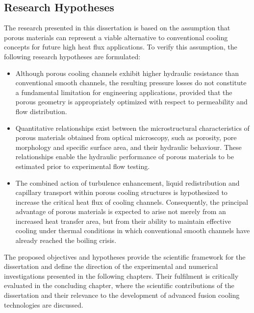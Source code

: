 \documentclass[a4paper]{article}
\begin{document}
\subsection{Research Hypotheses}

The research presented in this dissertation is based on the assumption that porous materials can represent a viable alternative to conventional cooling concepts for future high heat flux applications. To verify this assumption, the following research hypotheses are formulated:

\begin{itemize}

\item[\textbf{H1}] Although porous cooling channels exhibit higher hydraulic resistance than conventional smooth channels, the resulting pressure losses do not constitute a fundamental limitation for engineering applications, provided that the porous geometry is appropriately optimized with respect to permeability and flow distribution.

\item[\textbf{H2}] Quantitative relationships exist between the microstructural characteristics of porous materials obtained from optical microscopy, such as porosity, pore morphology and specific surface area, and their hydraulic behaviour. These relationships enable the hydraulic performance of porous materials to be estimated prior to experimental flow testing.

\item[\textbf{H3}] The combined action of turbulence enhancement, liquid redistribution and capillary transport within porous cooling structures is hypothesized to increase the critical heat flux of cooling channels. Consequently, the principal advantage of porous materials is expected to arise not merely from an increased heat transfer area, but from their ability to maintain effective cooling under thermal conditions in which conventional smooth channels have already reached the boiling crisis.
\end{itemize}

The proposed objectives and hypotheses provide the scientific framework for the dissertation and define the direction of the experimental and numerical investigations presented in the following chapters. Their fulfilment is critically evaluated in the concluding chapter, where the scientific contributions of the dissertation and their relevance to the development of advanced fusion cooling technologies are discussed.
\pagebreak
\end{document}
